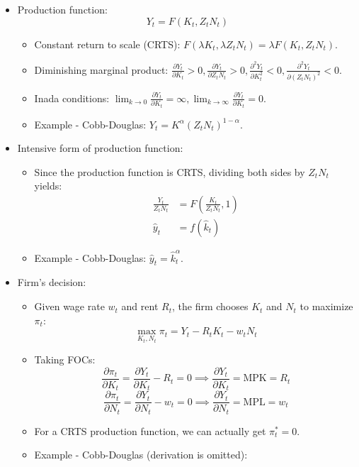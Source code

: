 \documentclass[notitlepage]{article}
\begin{document}
\begin{itemize}
\item Production function:
\[
Y_t = F(K_t, Z_tN_t)
\]
\begin{itemize}
\item Constant return to scale (CRTS): $F(\lambda K_t, \lambda Z_tN_t) = \lambda F(K_t, Z_tN_t)$.
\item Diminishing marginal product: $\frac{\partial Y_t}{\partial K_t} > 0, \frac{\partial Y_t}{\partial Z_tN_t} > 0, \frac{\partial^2 Y_t}{\partial K_t^2} < 0,  \frac{\partial^2 Y_t}{\partial (Z_tN_t)^2} < 0$.
\item Inada conditions: $\lim_{k\to0}\frac{\partial Y_t}{\partial K_t} = \infty, \lim_{k\to\infty}\frac{\partial Y_t}{\partial K_t} = 0$.
\item Example - Cobb-Douglas: $Y_t = K^\alpha (Z_tN_t)^{1-\alpha}$.
\end{itemize}
\item Intensive form of production function:
\begin{itemize}
\item Since the production function is CRTS, dividing both sides by $Z_tN_t$ yields:
\begin{align*}
\frac{Y_t}{Z_tN_t} &= F\left(\frac{K_t}{Z_tN_t}, 1\right) \\
\hat{y}_t &= f(\hat{k}_t)
\end{align*}
\item Example - Cobb-Douglas: $\hat{y}_t = \hat{k}^\alpha_t$.
\end{itemize}
\item Firm's decision:
\begin{itemize}
\item Given wage rate $w_t$ and rent $R_t$, the firm chooses $K_t$ and $N_t$ to maximize $\pi_t$:
\[
\max_{K_t,N_t} \pi_t = Y_t - R_tK_t - w_tN_t
\]
\item Taking FOCs:
\[
\frac{\partial \pi_t}{\partial K_t} = \frac{\partial Y_t}{\partial K_t} - R_t = 0 \implies \frac{\partial Y_t}{\partial K_t} = \text{MPK} = R_t
\]
\[
\frac{\partial \pi_t}{\partial N_t} = \frac{\partial Y_t}{\partial N_t} - w_t = 0 \implies \frac{\partial Y_t}{\partial N_t} = \text{MPL} = w_t
\]
\item For a CRTS production function, we can actually get $\pi^*_t = 0$.
\item Example - Cobb-Douglas (derivation is omitted):

\end{itemize}
\end{itemize}
\end{document}
